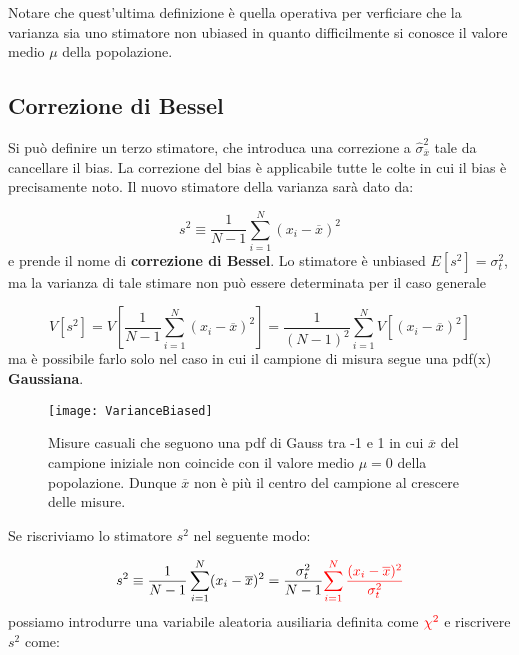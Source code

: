 \noindent Notare che quest'ultima definizione \`{e} quella operativa per verficiare che la varianza sia uno stimatore non ubiased in quanto difficilmente si conosce il valore medio $\mu$ della popolazione. 

\subsection{Correzione di Bessel}

Si pu\`{o} definire un terzo stimatore, che introduca una correzione a $\hat{\sigma}_{\overline{x}}^2$ tale da cancellare il bias. La correzione del bias \`{e} applicabile tutte le colte in cui il bias \`{e} precisamente noto. Il nuovo stimatore della varianza sar\`{a} dato da:

\begin{equation}
	s^2 \equiv \dfrac{1}{N-1} \sum_{i=1}^N (x_i - \overline{x})^2
\end{equation}
\newline
e prende il nome di \textbf{correzione di Bessel}.
\newline
Lo stimatore \`{e} unbiased $E[s^2] = \sigma_t^2$, ma la varianza di tale stimare non pu\`{o} essere determinata per il caso generale

\begin{equation*}
	V[s^2] = V[\dfrac{1}{N-1} \sum_{i=1}^N (x_i - \overline{x})^2] = \dfrac{1}{(N-1)^2} \sum_{i=1}^N V[(x_i - \overline{x})^2]
\end{equation*}
\newline
ma \`{e} possibile farlo solo nel caso in cui il campione di misura segue una pdf(x)\textbf{ Gaussiana}.
\begin{figure}[!ht]
\vspace{0.1in}
\texttt{[image: VarianceBiased]}	
\centering
\vspace{0.3in}
\caption{Misure casuali che seguono una pdf di Gauss tra -1 e 1 in cui $\overline{x}$ del campione iniziale non coincide con il valore medio $\mu = 0$ della popolazione. Dunque $\overline{x}$ non \`{e} pi\`{u} il centro del campione al crescere delle misure. }
\end{figure}

\noindent Se riscriviamo lo stimatore $s^2$ nel seguente modo:

\begin{equation*}
s^2 \equiv \dfrac{1}{N-1} \sum_{i=1}^N (x_i - \overline{x})^2 = \dfrac{\sigma_t^2}{N-1} \textcolor{red}{\sum_{i=1}^N \dfrac{(x_i - \overline{x})^2}{\sigma_t^2}}
\end{equation*}
possiamo introdurre una variabile aleatoria ausiliaria definita come $\textcolor{red}{\chi^2}$ e riscrivere $s^2$ come:

